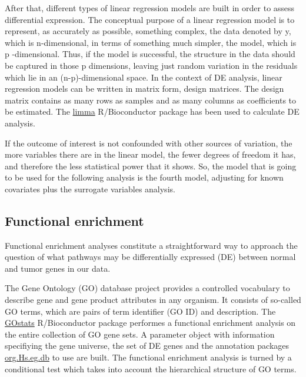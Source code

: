 \documentclass[9pt,twocolumn,twoside]{gsajnl}
\begin{document}
After that, different types of linear regression models are built in order to assess differential expression. The conceptual purpose of a linear regression model is to represent, as accurately as possible, something complex, the data denoted by y, which is n-dimensional, in terms of something much simpler, the model, which is p -dimensional. Thus, if the model is successful, the structure in the data should be captured in those p dimensions, leaving just random variation in the residuals which lie in an (n-p)-dimensional space. In the context of DE analysis, linear regression models can be written in matrix form, design matrices. The design matrix contains as many rows as samples and as many columns as coefficients to be estimated. The \href{https://bioconductor.org/packages/release/bioc/html/limma.html}{limma} R/Bioconductor package has been used to calculate DE analysis.

If the outcome of interest is not confounded with other sources of variation, the more variables there are in the linear model, the fewer degrees of freedom it has, and therefore the less statistical power that it shows. So, the model that is going to be used for the following analysis is the fourth model, adjusting for known covariates plus the surrogate variables analysis.

\subsection*{Functional enrichment}

Functional enrichment analyses constitute a straightforward way to approach the question of what pathways may be differentially expressed (DE) between normal and tumor genes in our data.

The Gene Ontology (GO) database project provides a controlled vocabulary to describe gene and gene product attributes in any organism. It consists of so-called GO terms, which are pairs of term identifier (GO ID) and description. The \href{http://www.bioconductor.org/packages/release/bioc/html/GOstats.html}{GOstats} R/Bioconductor package performes a functional enrichment analysis on the entire collection of GO gene sets. A parameter object with information specifiying the gene universe, the set of DE genes and the annotation packages \href{https://bioconductor.org/packages/release/data/annotation/html/org.Hs.eg.db.html}{org.Hs.eg.db} to use are built. The functional enrichment analysis is turned by a conditional test which takes into account the hierarchical structure of GO terms.
\end{document}
